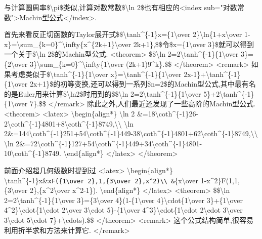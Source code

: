 \documentclass[
]{article}
\begin{document}
与计算圆周率\$\textbackslash pi\$类似,计算对数常数\$\textbackslash ln
2\$也有相应的\textless index
sub="对数常数"\textgreater Machin型公式\textless/index\textgreater.

首先来看反正切函数的Taylor展开式\$\$\textbackslash tanh\^{}\{-1\}x=\{1\textbackslash over
2\}\textbackslash ln\{1+x\textbackslash over
1-x\}=\textbackslash sum\_\{k=0\}\^{}\textbackslash infty\{x\^{}\{2k+1\}\textbackslash over
2k+1\},\$\$令\$x=\{1\textbackslash over
3\}\$就可以得到一个关于\$\textbackslash ln 2\$的Machin型公式.
\textless theorem\textgreater{} \$\$\textbackslash ln
2=2\textbackslash tanh\^{}\{-1\}\{1\textbackslash over
3\}=\{2\textbackslash over
3\}\textbackslash sum\_\{k=0\}\^{}\textbackslash infty\{1\textbackslash over
(2k+1)9\^{}k\}.\$\$ \textless/theorem\textgreater{}
\textless remark\textgreater{}
如果考虑类似于\$\textbackslash tanh\^{}\{-1\}\{1\textbackslash over
x\}=\textbackslash tanh\^{}\{-1\}\{1\textbackslash over
2x-1\}+\textbackslash tanh\^{}\{-1\}\{1\textbackslash over
2x+1\}\$的初等变换,还可以得到一系列\$n=2\$的Machin型公式,其中最有名的是Euler用来计算\$\textbackslash ln2\$时用到的\$\$\textbackslash ln
2=2\textbackslash tanh\^{}\{-1\}\{1\textbackslash over
5\}+2\textbackslash tanh\^{}\{-1\}\{1\textbackslash over 7\}.\$\$
\textless/remark\textgreater{}
除此之外,人们最近还发现了一些高阶的Machin型公式.
\textless theorem\textgreater{} \textless latex\textgreater{}
\textbackslash begin\{align*\} \textbackslash ln 2
\&=18\textbackslash coth\^{}\{-1\}26-2\textbackslash coth\^{}\{-1\}4801+8\textbackslash coth\^{}\{-1\}8749,\textbackslash\textbackslash{}
\textbackslash ln
2\&=144\textbackslash coth\^{}\{-1\}251+54\textbackslash coth\^{}\{-1\}449-38\textbackslash coth\^{}\{-1\}4801+62\textbackslash coth\^{}\{-1\}8749,\textbackslash\textbackslash{}
\textbackslash ln
2\&=72\textbackslash coth\^{}\{-1\}127+54\textbackslash coth\^{}\{-1\}449+34\textbackslash coth\^{}\{-1\}4801-10\textbackslash coth\^{}\{-1\}8749.
\textbackslash end\{align*\} \textless/latex\textgreater{}
\textless/theorem\textgreater{}

前面介绍超几何级数时提到过 \textless latex\textgreater{}
\textbackslash begin\{align*\}
\textbackslash tanh\^{}\{-1\}x\&\texttt{xF(\{1\textbackslash{}over\ 2\},1,\{3\textbackslash{}over\ 2\},x\^{}2)\textbackslash{}\textbackslash{}
\&}\{x\textbackslash over 1-x\^{}2\}F(1,1,\{3\textbackslash over
2\},\{x\^{}2\textbackslash over x\^{}2-1\}).
\textbackslash end\{align*\} \textless/latex\textgreater{}
\textless theorem\textgreater{} \$\$\textbackslash ln
2=2\textbackslash tanh\^{}\{-1\}\{1\textbackslash over
3\}=\{3\textbackslash over 4\}(1-\{1\textbackslash over
4\}\textbackslash cdot\{1\textbackslash over 3\}+\{1\textbackslash over
4\^{}2\}\textbackslash cdot\{1\textbackslash cdot 2\textbackslash over
3\textbackslash cdot 5\}-\{1\textbackslash over
4\^{}3\}\textbackslash cdot\{1\textbackslash cdot 2\textbackslash cdot
3\textbackslash over 3\textbackslash cdot 5\textbackslash cdot
7\}+\textbackslash cdots).\$\$ \textless/theorem\textgreater{}
\textless remark\textgreater{}
这个公式结构简单,很容易利用折半求和方法来计算它.
\textless/remark\textgreater{}
\end{document}
